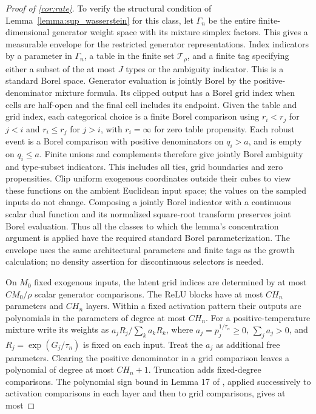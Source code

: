 \begin{proof}[Proof of \cref{cor:rate}]
To verify the structural condition of Lemma~\ref{lemma:sup_wasserstein} for this class, let $\Gamma_n$ be the entire finite-dimensional generator weight space with its mixture simplex factors. This gives a measurable envelope for the restricted generator representations. Index indicators by a parameter in $\Gamma_n$, a table in the finite set $\mathcal T_\rho$, and a finite tag specifying either a subset of the at most $J$ types or the ambiguity indicator. This is a standard Borel space. Generator evaluation is jointly Borel by the positive-denominator mixture formula. Its clipped output has a Borel grid index when cells are half-open and the final cell includes its endpoint. Given the table and grid index, each categorical choice is a finite Borel comparison using $r_i<r_j$ for $j<i$ and $r_i\leqslant r_j$ for $j>i$, with $r_i=\infty$ for zero table propensity. Each robust event is a Borel comparison with positive denominators on $q_i>a$, and is empty on $q_i\leqslant a$. Finite unions and complements therefore give jointly Borel ambiguity and type-subset indicators. This includes all ties, grid boundaries and zero propensities. Clip uniform exogenous coordinates outside their cubes to view these functions on the ambient Euclidean input space; the values on the sampled inputs do not change. Composing a jointly Borel indicator with a continuous scalar dual function and its normalized square-root transform preserves joint Borel evaluation. Thus all the classes to which the lemma's concentration argument is applied have the required standard Borel parameterization. The envelope uses the same architectural parameters and finite tags as the growth calculation; no density assertion for discontinuous selectors is needed. 

On $M_0$ fixed exogenous inputs, the latent grid indices are determined by at most $CM_0/\rho$ scalar generator comparisons. The ReLU blocks have at most $CH_n$ parameters and $CH_n$ layers. Within a fixed activation pattern their outputs are polynomials in the parameters of degree at most $CH_n$. For a positive-temperature mixture write its weights as $a_jR_j/\sum_k a_kR_k$, where $a_j=p_j^{1/\tau_n}\geqslant0$, $\sum_j a_j>0$, and $R_j=\exp(G_j/\tau_n)$ is fixed on each input. Treat the $a_j$ as additional free parameters. Clearing the positive denominator in a grid comparison leaves a polynomial of degree at most $CH_n+1$. Truncation adds fixed-degree comparisons. The polynomial sign bound in Lemma 17 of \cite{bartlett2019nearly}, applied successively to activation comparisons in each layer and then to grid comparisons, gives at most


\end{proof}
